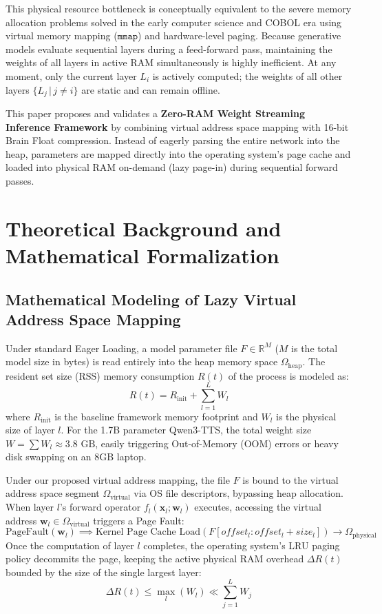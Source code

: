 \documentclass[twocolumn]{article}
\begin{document}
This physical resource bottleneck is conceptually equivalent to the severe memory allocation problems solved in the early computer science and COBOL era using virtual memory mapping ($\mathtt{mmap}$) and hardware-level paging. Because generative models evaluate sequential layers during a feed-forward pass, maintaining the weights of all layers in active RAM simultaneously is highly inefficient. At any moment, only the current layer $L_i$ is actively computed; the weights of all other layers $\{L_j \,|\, j \neq i\}$ are static and can remain offline.

This paper proposes and validates a \textbf{Zero-RAM Weight Streaming Inference Framework} by combining virtual address space mapping with 16-bit Brain Float compression. Instead of eagerly parsing the entire network into the heap, parameters are mapped directly into the operating system's page cache and loaded into physical RAM on-demand (lazy page-in) during sequential forward passes.

\section{Theoretical Background and Mathematical Formalization}
\subsection{Mathematical Modeling of Lazy Virtual Address Space Mapping}
Under standard Eager Loading, a model parameter file $F \in \mathbb{R}^{M}$ ($M$ is the total model size in bytes) is read entirely into the heap memory space $\Omega_{\text{heap}}$. The resident set size (RSS) memory consumption $R(t)$ of the process is modeled as:
\begin{equation}
R(t) = R_{\text{init}} + \sum_{l=1}^{L} W_{l}
\end{equation}
where $R_{\text{init}}$ is the baseline framework memory footprint and $W_{l}$ is the physical size of layer $l$. For the 1.7B parameter Qwen3-TTS, the total weight size $W = \sum W_l \approx 3.8 \text{ GB}$, easily triggering Out-of-Memory (OOM) errors or heavy disk swapping on an 8GB laptop.

Under our proposed virtual address mapping, the file $F$ is bound to the virtual address space segment $\Omega_{\text{virtual}}$ via OS file descriptors, bypassing heap allocation. When layer $l$'s forward operator $f_l(\mathbf{x}_l; \mathbf{w}_l)$ executes, accessing the virtual address $\mathbf{w}_l \in \Omega_{\text{virtual}}$ triggers a Page Fault:
\begin{equation}
\text{PageFault}(\mathbf{w}_l) \implies \text{Kernel Page Cache Load}(F[offset_l : offset_l + size_l]) \to \Omega_{\text{physical}}
\end{equation}
Once the computation of layer $l$ completes, the operating system's LRU paging policy decommits the page, keeping the active physical RAM overhead $\Delta R(t)$ bounded by the size of the single largest layer:
\begin{equation}
\Delta R(t) \le \max_{l} (W_l) \ll \sum_{j=1}^{L} W_j
\end{equation}
\end{document}
